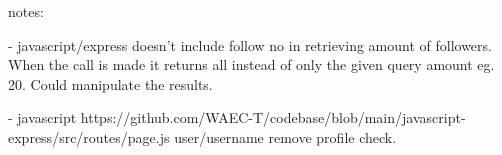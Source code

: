 notes:

- javascript/express doesn't include follow no in retrieving amount of followers. When the call is made it returns all instead of only the given query amount eg. 20. Could manipulate the results.

- javascript https://github.com/WAEC-T/codebase/blob/main/javascript-express/src/routes/page.js
user/username remove profile check.